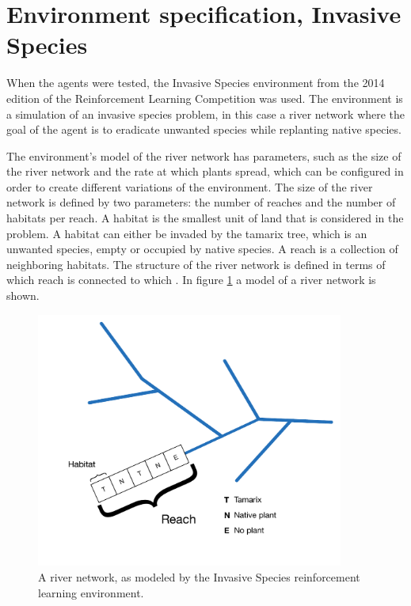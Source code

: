 \section{Environment specification, Invasive Species}
\label{sec:experiment_env}

When the agents were tested, the Invasive Species environment from the 2014 edition of
the Reinforcement Learning Competition was used. The environment is a
simulation of an invasive species problem, in this case a river network where the goal of the agent is to eradicate unwanted species
while replanting native species. 

The environment's model of the river network has parameters, such as the size
of the river network and the rate at which plants spread, which can be
configured in order to create different variations of the environment.  The
size of the river network is defined by two parameters: the number of reaches
and the number of habitats per reach. A habitat is the smallest unit of land
that is considered in the problem. A habitat can either be invaded by the
tamarix tree, which is an unwanted species, empty or occupied by native species. A
reach is a collection of neighboring habitats. The structure of the river
network is defined in terms of which reach is connected to which
\parencite{invasiveSpecis2014:Online}. In figure \ref{fig:river} a model of a
river network is shown.

\begin{figure}[ht]
\centering
\includegraphics[width=0.9\textwidth]{images/river_network.pdf}
\caption{A river network, as modeled by the Invasive Species reinforcement learning environment.}
\label{fig:river}
\end{figure}

